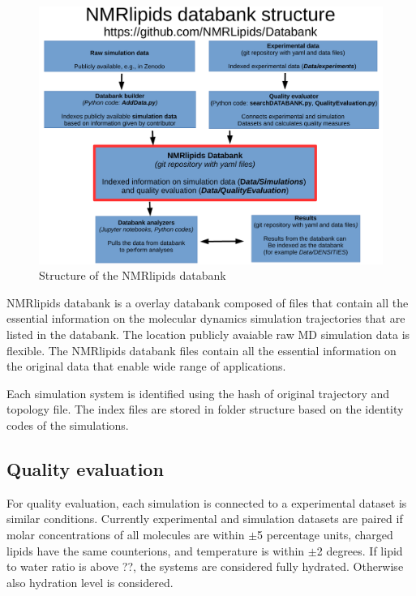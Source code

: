 \documentclass[fleqn,10pt]{wlscirep}
\begin{document}
\begin{figure}
  \includegraphics[width=\textwidth]{figures/DataBankStructure.pdf}
  \caption{Structure of the NMRlipids databank}\label{DatabankStructure}
\end{figure}

NMRlipids databank is a overlay databank composed of files that contain all the essential information
on the molecular dynamics simulation trajectories that are listed in the databank.
The location publicly avaiable raw MD simulation data is flexible.
The NMRlipids databank files contain all the essential information on the
original data that enable wide range of applications.

Each simulation system is identified using the hash of original trajectory and topology file. The index files are stored in folder structure based on the identity codes of the simulations.


\subsection{Quality evaluation}

For quality evaluation, each simulation is connected to a experimental dataset is similar conditions. Currently experimental and simulation datasets are paired if molar concentrations of all molecules are within $\pm$5 percentage units, charged lipids have the same counterions, and temperature is within $\pm$2 degrees. If lipid to water ratio is above ??, the systems are considered fully hydrated. Otherwise also hydration level is considered.
\end{document}
